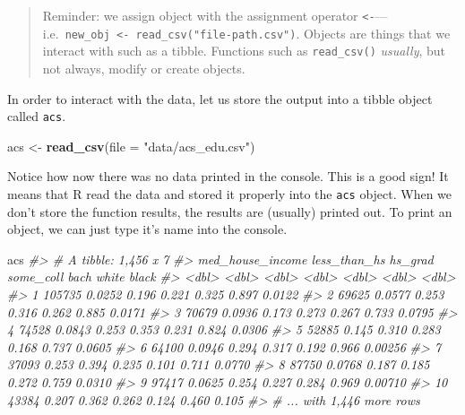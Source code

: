 \documentclass[
]{book}
\newenvironment{Shaded}{\begin{snugshade}}{\end{snugshade}}
\newcommand{\CommentTok}[1]{\textcolor[rgb]{0.56,0.35,0.01}{\textit{#1}}}
\newcommand{\DataTypeTok}[1]{\textcolor[rgb]{0.13,0.29,0.53}{#1}}
\newcommand{\KeywordTok}[1]{\textcolor[rgb]{0.13,0.29,0.53}{\textbf{#1}}}
\newcommand{\NormalTok}[1]{#1}
\newcommand{\StringTok}[1]{\textcolor[rgb]{0.31,0.60,0.02}{#1}}
\begin{document}
\begin{quote}
Reminder: we assign object with the assignment operator \texttt{\textless{}-}---i.e.~\texttt{new\_obj\ \textless{}-\ read\_csv("file-path.csv")}. Objects are things that we interact with such as a tibble. Functions such as \texttt{read\_csv()} \emph{usually}, but not always, modify or create objects.
\end{quote}

In order to interact with the data, let us store the output into a tibble object called \texttt{acs}.

\begin{Shaded}
\begin{Highlighting}[]
\NormalTok{acs \textless{}{-}}\StringTok{ }\KeywordTok{read\_csv}\NormalTok{(}\DataTypeTok{file =} \StringTok{"data/acs\_edu.csv"}\NormalTok{) }
\end{Highlighting}
\end{Shaded}

Notice how now there was no data printed in the console. This is a good sign! It means that R read the data and stored it properly into the \texttt{acs} object. When we don't store the function results, the results are (usually) printed out. To print an object, we can just type it's name into the console.

\begin{Shaded}
\begin{Highlighting}[]
\NormalTok{acs}
\CommentTok{\#\textgreater{} \# A tibble: 1,456 x 7}
\CommentTok{\#\textgreater{}    med\_house\_income less\_than\_hs hs\_grad some\_coll  bach white   black}
\CommentTok{\#\textgreater{}               \textless{}dbl\textgreater{}        \textless{}dbl\textgreater{}   \textless{}dbl\textgreater{}     \textless{}dbl\textgreater{} \textless{}dbl\textgreater{} \textless{}dbl\textgreater{}   \textless{}dbl\textgreater{}}
\CommentTok{\#\textgreater{}  1           105735       0.0252   0.196     0.221 0.325 0.897 0.0122 }
\CommentTok{\#\textgreater{}  2            69625       0.0577   0.253     0.316 0.262 0.885 0.0171 }
\CommentTok{\#\textgreater{}  3            70679       0.0936   0.173     0.273 0.267 0.733 0.0795 }
\CommentTok{\#\textgreater{}  4            74528       0.0843   0.253     0.353 0.231 0.824 0.0306 }
\CommentTok{\#\textgreater{}  5            52885       0.145    0.310     0.283 0.168 0.737 0.0605 }
\CommentTok{\#\textgreater{}  6            64100       0.0946   0.294     0.317 0.192 0.966 0.00256}
\CommentTok{\#\textgreater{}  7            37093       0.253    0.394     0.235 0.101 0.711 0.0770 }
\CommentTok{\#\textgreater{}  8            87750       0.0768   0.187     0.185 0.272 0.759 0.0310 }
\CommentTok{\#\textgreater{}  9            97417       0.0625   0.254     0.227 0.284 0.969 0.00710}
\CommentTok{\#\textgreater{} 10            43384       0.207    0.362     0.262 0.124 0.460 0.105  }
\CommentTok{\#\textgreater{} \# ... with 1,446 more rows}
\end{Highlighting}
\end{Shaded}
\end{document}
